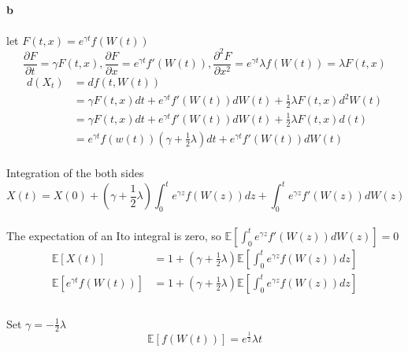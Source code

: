 \documentclass{article}
\begin{document}
\paragraph{b}
\paragraph{}{let $F(t,x)=e^{\gamma t}f(W(t))$}
\begin{displaymath}
 \frac{\partial F}{\partial t}=\gamma F(t,x),\frac{\partial F}{\partial x}=e^{\gamma t}f'(W(t)),\frac{\partial^2 F}{\partial x^2}=e^{\gamma t}\lambda f(W(t))=\lambda F(t,x)
\end{displaymath}
\begin{align*}
  d(X_t) & =df(t,W(t)) \\
   &= \gamma F(t,x)dt+e^{\gamma t}f'(W(t))dW(t)+\frac{1}{2}\lambda F(t,x)d^2W(t)\\
   &= \gamma F(t,x)dt+e^{\gamma t}f'(W(t))dW(t)+\frac{1}{2}\lambda F(t,x)d(t)\\
   &=e^{\gamma t}f(w(t))(\gamma +\frac{1}{2}\lambda)dt+e^{\gamma t}f'(W(t))dW(t)\end{align*}
\paragraph{}{ Integration of the both sides}
\begin{displaymath}
  X(t)=X(0)+(\gamma +\frac{1}{2}\lambda)\int_{0}^{t}e^{\gamma z}f(W(z))dz+\int_{0}^{t}e^{\gamma z}f'(W(z))dW(z)
\end{displaymath}
\paragraph{}{The expectation of an Ito integral is zero, so $\mathbb{E}[\int_{0}^{t}e^{\gamma z}f'(W(z))dW(z)]=0$}
\begin{align*}
  \mathbb{E}[X(t)] & =1+(\gamma +\frac{1}{2}\lambda)\mathbb{E}[\int_{0}^{t}e^{\gamma z}f(W(z))dz] \\
  \mathbb{E}[e^{\gamma t}f(W(t))]&=1+(\gamma +\frac{1}{2}\lambda)\mathbb{E}[\int_{0}^{t}e^{\gamma z}f(W(z))dz] \\
\end{align*}
\paragraph{}{Set $\gamma = - \frac{1}{2}\lambda$}
\begin{displaymath}
  \mathbb{E}[f(W(t))]=e^\frac{1}{2}\lambda t
\end{displaymath}
\end{document}
